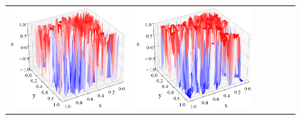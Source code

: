 \documentclass[12pt, reqno]{report}
\theoremstyle{definition}
\theoremstyle{remark}
\begin{document}
\begin{figure}[H]
\begin{tabular}{rccccc}
        \includegraphics[align = c, height=\subheight]{media_paper/AC_surf_MD_n=200.png} &
        \includegraphics[align = c, height=\subheight]{media_paper/AC_surf_MD_n=500.png} &

\end{tabular}
\end{figure}
\end{document}
